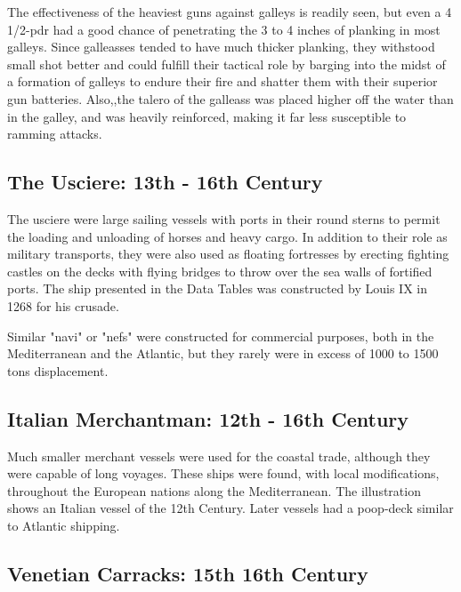 \documentclass{article}
\begin{document}
\begin{multicols}{2}
The effectiveness of the heaviest guns against galleys is readily
seen, but even a 4 1/2-pdr had a good chance of penetrating the 3 to 4
inches of planking in most galleys.  Since galleasses tended to have
much thicker planking, they withstood small shot better and could
fulfill their tactical role by barging into the midst of a formation
of galleys to endure their fire and shatter them with their superior
gun batteries.  Also,,the talero of the galleass was placed higher off
the water than in the galley, and was heavily reinforced, making it
far less susceptible to ramming attacks.


\subsection{The Usciere:  13th - 16th Century}

The usciere were large sailing vessels with ports in their round
sterns to permit the loading and unloading of horses and heavy cargo.
In addition to their role as military transports, they were also used
as floating fortresses by erecting fighting castles on the decks with
flying bridges to throw over the sea walls of fortified ports.  The
ship presented in the Data Tables was constructed by Louis IX in 1268
for his crusade.

Similar "navi" or "nefs" were constructed for commercial purposes,
both in the Mediterranean and the Atlantic, but they rarely were in
excess of 1000 to 1500 tons displacement.

\subsection{Italian Merchantman:  12th - 16th Century}

Much smaller merchant vessels were used for the coastal trade,
although they were capable of long voyages.  These ships were found,
with local modifications, throughout the European nations along the
Mediterranean.  The illustration shows an Italian vessel of the 12th
Century.  Later vessels had a poop-deck similar to Atlantic shipping.

\subsection{Venetian Carracks:  15th   16th Century}


\end{multicols}
\end{document}
